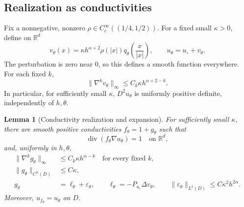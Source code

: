 \documentclass[11pt]{article}
\newtheorem{lemma}[theorem]{Lemma}
\theoremstyle{remark}
\newcommand{\R}{\mathbb R}
\DeclareMathOperator{\divergence}{div}
\begin{document}
\subsection{Realization as conductivities}

Fix a nonnegative, nonzero
\(\rho\in C^\infty_c((1/4,1/2))\).
For a fixed small \(\kappa>0\), define on \(\R^d\)
\[
v_\theta(x)=
\kappa h^{\alpha+2}\rho(|x|)
q_\theta\!\left(\frac{x}{|x|}\right),
\qquad
u_\theta=u_\circ+v_\theta.
\]
The perturbation is zero near \(0\), so this defines a smooth
function everywhere. For each fixed \(k\),
\begin{equation}\label{eq:v-derivatives}
\|\nabla^kv_\theta\|_\infty
\leq C_k\kappa h^{\alpha+2-k}.
\end{equation}
In particular, for sufficiently small \(\kappa\),
\(D^2u_\theta\) is uniformly positive definite, independently of
\(h,\theta\).

\begin{lemma}[Conductivity realization and expansion]\label{lem:realization}
For sufficiently small \(\kappa\), there are smooth positive
conductivities \(f_\theta=1+g_\theta\) such that
\[
\divergence(f_\theta\nabla u_\theta)=1
\quad\text{on }\R^d,
\]
and, uniformly in \(h,\theta\),
\begin{align}
\|\nabla^kg_\theta\|_\infty
&\leq C_k\kappa h^{\alpha-k}
\quad\text{for every fixed }k,\label{eq:g-derivatives}\\
\|g_\theta\|_{C^\alpha(D)}
&\leq C\kappa,\label{eq:g-class}\\
g_\theta&=\ell_\theta+\varepsilon_\theta,\qquad
\ell_\theta=-P_{u_\circ}\Delta v_\theta,\qquad
\|\varepsilon_\theta\|_{L^2(D)}
\leq C\kappa^2h^{2\alpha}.
\label{eq:lower-expansion}
\end{align}
Moreover, \(u_{f_\theta}=u_\theta\) on \(D\).
\end{lemma}
\end{document}
